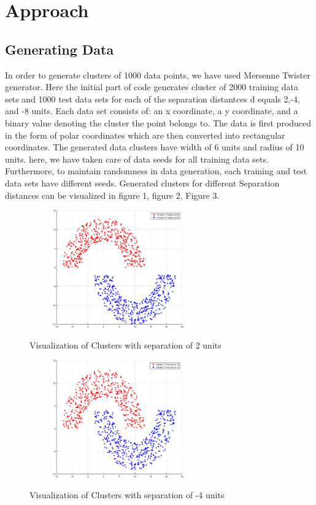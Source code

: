 \documentclass[conference]{IEEEtran}
\begin{document}
\section{Approach}

\subsection{Generating Data}
In order to generate clusters of 1000 data points, we have used Mersenne Twister \cite{twister} generator. Here the initial part of code generates cluster of 2000 training data sets and 1000 test data sets for each of the separation distantces d equals 2,-4, and -8 units. Each data set consists of: an x coordinate, a y coordinate, and a binary value denoting the cluster the point belongs to. The data is first produced in the form of polar coordinates which are then converted into rectangular coordinates. The generated data clusters have width of 6 units and radius of 10 units. here, we have taken care of data seeds for all training data sets. Furthermore, to maintain randomness in data generation, each training and test data sets have different seeds\cite{rng}. Generated clusters for different Separation distances can be visualized in figure 1, figure 2, Figure 3. 
\begin{figure}
\centering
{\includegraphics[width=3in,height=2in,clip,keepaspectratio]{ClustersD2.eps} }\\
\caption{ Visualization of Clusters with separation of 2 units}
\end{figure}

\begin{figure}
\centering
{\includegraphics[width=3in,height=2in,clip,keepaspectratio]{ClustersDn4.eps} }\\
\caption{ Visualization of Clusters with separation of -4 units}
\end{figure}
\end{document}
